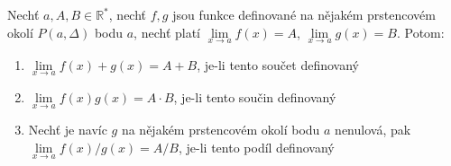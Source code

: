 \begin{theorem}
	Nechť $a, A, B \in \mathbb{R}^*$,
	nechť $f, g$ jsou funkce definované na nějakém prstencovém okolí $P(a, \Delta)$ bodu $a$,
	nechť platí $\underset{x \rightarrow a}{\lim} f(x) = A$, $\underset{x \rightarrow a}{\lim} g(x) = B$.
	Potom:
	\begin{enumerate}

		\item  $\underset{x \rightarrow a}{\lim} f(x) + g(x) = A + B$, je-li tento součet definovaný
			\label{thm:aritmetika_limit_funkci:soucet}

		\item  $\underset{x \rightarrow a}{\lim} f(x) g(x) = A \cdot B$, je-li tento součin definovaný
			\label{thm:aritmetika_limit_funkci:soucin}

		\item  Nechť je navíc $g$ na nějakém prstencovém okolí bodu $a$ nenulová, pak
			$\underset{x \rightarrow a}{\lim} f(x) / g(x) = A / B$, je-li tento podíl definovaný
			\label{thm:aritmetika_limit_funkci:podil}

	\end{enumerate}
	\label{thm:aritmetika_limit_funkci}
\end{theorem}

